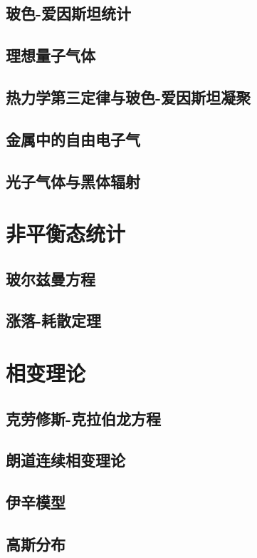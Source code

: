 \documentclass[a4paper]{report}
\begin{document}
\section{玻色-爱因斯坦统计}
\section{理想量子气体}
\section{热力学第三定律与玻色-爱因斯坦凝聚}
\section{金属中的自由电子气}
\section{光子气体与黑体辐射}

\chapter{非平衡态统计}
\section{玻尔兹曼方程}
\section{涨落-耗散定理}
\chapter{相变理论}
\section{克劳修斯-克拉伯龙方程}
\section{朗道连续相变理论}
\section{伊辛模型}

\appendix
\section{高斯分布}

%
\end{document}
